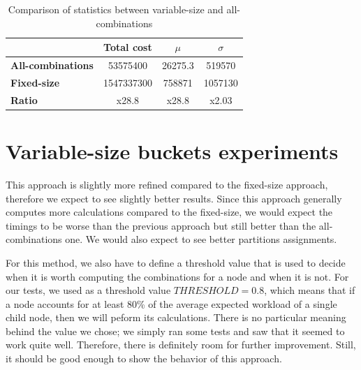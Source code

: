 \begin{table}[!htb]
  \centering
  \begin{tabular}{l c c c}
    \hline
    & \textbf{Total cost} & \textbf{$\mu$} & \textbf{$\sigma$} \\
    \hline
    \textbf{All-combinations} & 53575400 & 26275.3 & 519570\\
    \textbf{Fixed-size} & 1547337300 & 758871 & 1057130 \\
    \hline
    \textbf{Ratio} & x28.8 & x28.8 & x2.03 \\
    \hline
  \end{tabular}
  \caption{Comparison of statistics between variable-size and all-combinations}\label{tab:mean-stddev-fixed-all}
\end{table}


\section{Variable-size buckets experiments}\label{sec:Variable-Size-buckets-tests}
This approach is slightly more refined compared to the fixed-size approach, therefore we expect to see slightly better results. Since this approach generally computes more calculations compared to the fixed-size, we would expect the timings to be worse than the previous approach but still better than the all-combinations one. We would also expect to see better partitions assignments. 

For this method, we also have to define a threshold value that is used to decide when it is worth computing the combinations for a node and when it is not. For our tests, we used as a threshold value $THRESHOLD = 0.8$, which means that if a node accounts for at least 80\% of the average expected workload of a single child node, then we will peform its calculations. There is no particular meaning behind the value we chose; we simply ran some tests and saw that it seemed to work quite well. Therefore, there is definitely room for further improvement. Still, it should be good enough to show the behavior of this approach.

